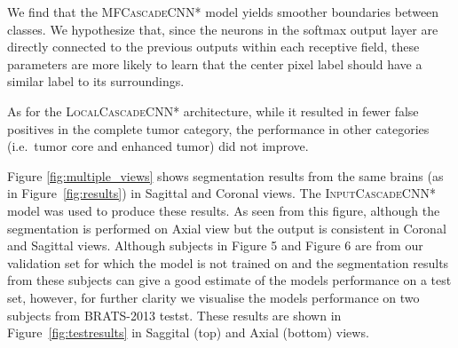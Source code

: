 \documentclass[final,5p,times,twocolumn]{elsarticle}
\begin{document}
{\begin{table}[t!]
\caption{Performance of the cascaded architectures. The reported results are from the second phase training. The `Rank' column shows the ranking of each method in the online score board at the time of submission.}

\begin{center}

\end{center}

\vspace*{-0.25cm}
\label{tab:test}
\end{table}

We find that the \textsc{MFCascadeCNN*} model yields smoother boundaries between classes. We hypothesize that, since the neurons in the softmax output layer are directly connected to the previous outputs within each receptive field, these parameters are more likely to learn that the center pixel label should have a similar label to its surroundings. 

As for the \textsc{LocalCascadeCNN*} architecture, while it resulted in fewer false positives in the complete tumor category, the performance in other categories (i.e.\ tumor core and enhanced tumor) did not improve.

 Figure \ref{fig:multiple_views} shows segmentation results from the same brains (as in Figure~\ref{fig:results}) in Sagittal and Coronal views. The \textsc{InputCascadeCNN*} model was used to produce these results. As seen from this figure, although the segmentation is performed on Axial view but the output is consistent in  Coronal and Sagittal views. Although subjects in Figure 5 and Figure 6 are from our validation set for which the model is not trained on and the segmentation results from these subjects can give a good estimate of the models performance on a test set, however, for further clarity we visualise the models performance on two subjects from BRATS-2013 testst. These results are shown in Figure~\ref{fig:testresults} in Saggital (top) and Axial (bottom) views.
 
}
\end{document}
